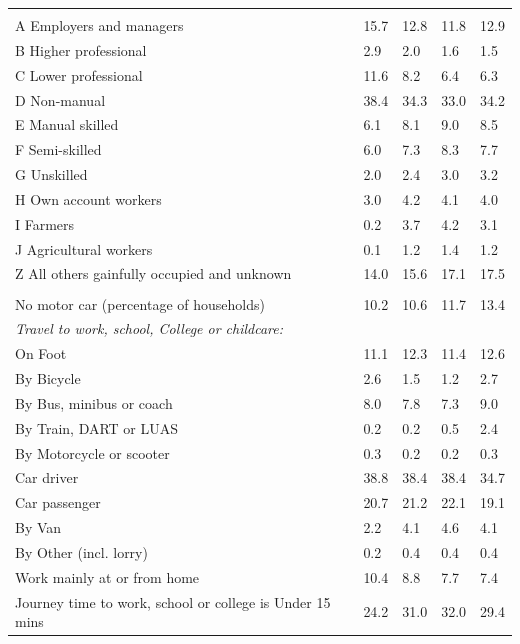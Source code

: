 \documentclass{article}
\begin{document}
\begin{table}[h]
\begin{tabular}{KTTTT}
\hline
    \\ 
    \hline
A Employers and managers & 15.7& 12.8& 11.8& 12.9\\
B Higher professional & 2.9& 2.0& 1.6& 1.5\\
C Lower professional & 11.6&  8.2&  6.4&  6.3\\
D Non-manual & 38.4& 34.3& 33.0& 34.2\\
E Manual skilled & 6.1& 8.1& 9.0& 8.5\\
F Semi-skilled & 6.0& 7.3& 8.3& 7.7\\
G Unskilled & 2.0& 2.4& 3.0& 3.2\\
H Own account workers & 3.0& 4.2& 4.1& 4.0\\
I Farmers & 0.2& 3.7& 4.2& 3.1\\
J Agricultural workers & 0.1& 1.2& 1.4& 1.2\\
Z All others gainfully occupied and unknown & 14.0& 15.6& 17.1& 17.5\\
\hline
{}\hline
    \\ 
    \hline
No motor car (percentage of households) & 10.2& 10.6& 11.7& 
13.4\\
    \hline 
\emph{Travel to work, school, College or childcare:} & & & \\
\quad On Foot & 11.1& 12.3& 11.4& 12.6\\ 
\quad By Bicycle & 2.6& 1.5& 1.2& 2.7\\ 
\quad By Bus, minibus or coach & 8.0& 7.8& 7.3& 9.0\\
\quad By Train, DART or LUAS & 0.2& 0.2& 0.5& 2.4\\
\quad By Motorcycle or scooter & 0.3& 0.2& 0.2& 0.3\\
\quad Car driver & 38.8 & 38.4& 38.4& 34.7\\
\quad Car passenger & 20.7& 21.2& 22.1& 19.1\\
\quad By Van & 2.2& 4.1& 4.6& 4.1\\
\quad By Other (incl. lorry) & 0.2& 0.4& 0.4& 0.4\\
    \hline
Work mainly at or from home & 10.4&  8.8&  7.7&  7.4\\
Journey time to work, school or college is Under 15 mins & 24.2& 31.0& 32.0& 29.4\\

\end{tabular}
\end{table}
\end{document}
